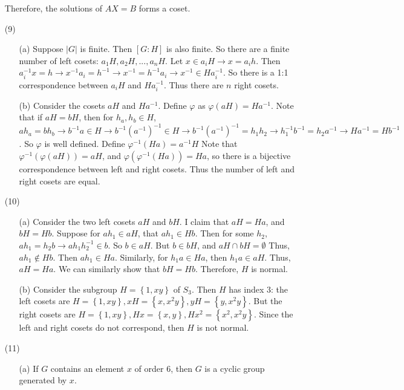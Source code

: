 \documentclass[12pt]{article}
\begin{document}
\begin{itemize}
Therefore, the solutions of $AX = B$ forms a coset.

\item[(9)]
\begin{itemize}
\item[(a)]
Suppose $|G|$ is finite. Then $[G : H]$ is also finite. So there are a finite number of left cosets: $a_1H, a_2H, ..., a_nH$. Let $x \in a_iH \rightarrow x = a_ih$. Then $a_i^{-1}x = h \rightarrow x^{-1}a_i = h^{-1} \rightarrow x^{-1} = h^{-1}a_i \rightarrow x^{-1} \in Ha_i^{-1}$. So there is a 1:1 correspondence between $a_iH$ and $Ha_i^{-1}$. Thus there are $n$ right cosets.
\item[(b)]
Consider the cosets $aH$ and $Ha^{-1}$. Define $\varphi$ as $\varphi(aH) = Ha^{-1}$. Note that if $aH = bH$, then for $h_a, h_b \in H$, $ah_a = bh_b \rightarrow b^{-1}a \in H \rightarrow b^{-1}(a^{-1})^{-1} \in H \rightarrow b^{-1}(a^{-1})^{-1} = h_1h_2 \rightarrow h_1^{-1}b^{-1} = h_2a^{-1} \rightarrow Ha^{-1} = Hb^{-1}$. So $\varphi$ is well defined. Define $\varphi^{-1}(Ha) = a^{-1}H$ Note that $\varphi^{-1}(\varphi(aH)) = aH$, and $\varphi(\varphi^{-1}(Ha)) = Ha$, so there is a bijective correspondence between left and right cosets. Thus the number of left and right cosets are equal.
\end{itemize}
\item[(10)]
\begin{itemize}
\item[(a)]
Consider the two left cosets $aH$ and $bH$. I claim that $aH = Ha$, and $bH = Hb$. Suppose for $ah_1 \in aH$, that $ah_1 \in Hb$. Then for some $h_2$, $ah_1 = h_2b \rightarrow ah_1h_2^{-1} \in b$. So $b \in aH$. But $b \in bH$, and $aH \cap bH = \emptyset$ Thus, $ah_1 \not \in Hb$. Then $ah_1 \in Ha$. Similarly, for $h_1a \in Ha$, then $h_1a \in aH$. Thus, $aH = Ha$. We can similarly show that $bH = Hb$. Therefore, $H$ is normal.
\item[(b)]
Consider the subgroup $H = \left\lbrace 1, xy \right\rbrace$ of $S_3$. Then $H$ has index 3: the left cosets are $H = \left\lbrace 1, xy \right\rbrace, xH = \left\lbrace x, x^2y \right\rbrace, yH = \left\lbrace y, x^2y \right\rbrace$. But the right cosets are $H = \left\lbrace 1, xy \right\rbrace, Hx = \left\lbrace x, y \right\rbrace, Hx^2 = \left\lbrace x^2, x^2y \right\rbrace$. Since the left and right cosets do not correspond, then $H$ is not normal.
\end{itemize}
\item[(11)]
\begin{itemize}
\item[(a)]
If $G$ contains an element $x$ of order 6, then $G$ is	 a cyclic group generated by $x$.


\end{itemize}
\end{itemize}
\end{document}
